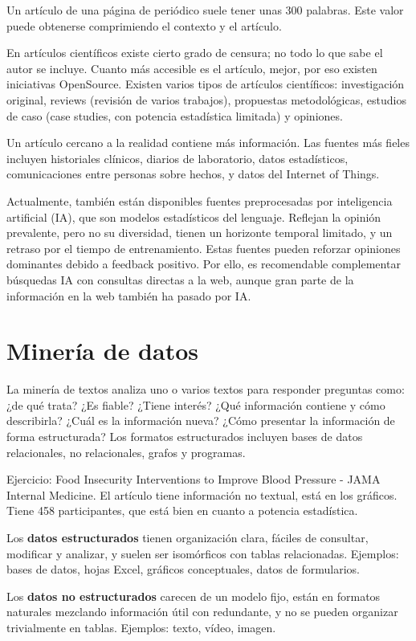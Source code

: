 Un artículo de una página de periódico suele tener unas 300 palabras. Este valor puede obtenerse comprimiendo el contexto y el artículo.

En artículos científicos existe cierto grado de censura; no todo lo que sabe el autor se incluye. Cuanto más accesible es el artículo, mejor, por eso existen iniciativas OpenSource. Existen varios tipos de artículos científicos: investigación original, reviews (revisión de varios trabajos), propuestas metodológicas, estudios de caso (case studies, con potencia estadística limitada) y opiniones.

Un artículo cercano a la realidad contiene más información. Las fuentes más fieles incluyen historiales clínicos, diarios de laboratorio, datos estadísticos, comunicaciones entre personas sobre hechos, y datos del Internet of Things.

Actualmente, también están disponibles fuentes preprocesadas por inteligencia artificial (IA), que son modelos estadísticos del lenguaje. Reflejan la opinión prevalente, pero no su diversidad, tienen un horizonte temporal limitado, y un retraso por el tiempo de entrenamiento. Estas fuentes pueden reforzar opiniones dominantes debido a feedback positivo. Por ello, es recomendable complementar búsquedas IA con consultas directas a la web, aunque gran parte de la información en la web también ha pasado por IA.

\section{Minería de datos}
La minería de textos analiza uno o varios textos para responder preguntas como: ¿de qué trata? ¿Es fiable? ¿Tiene interés? ¿Qué información contiene y cómo describirla? ¿Cuál es la información nueva? ¿Cómo presentar la información de forma estructurada?
Los formatos estructurados incluyen bases de datos relacionales, no relacionales, grafos y programas.

Ejercicio: Food Insecurity Interventions to Improve Blood Pressure - JAMA Internal Medicine. 
El artículo tiene información no textual, está en los gráficos. Tiene 458 participantes, que está bien en cuanto a potencia estadística. 

Los \textbf{datos estructurados} tienen organización clara, fáciles de consultar, modificar y analizar, y suelen ser isomórficos con tablas relacionadas. Ejemplos: bases de datos, hojas Excel, gráficos conceptuales, datos de formularios.

Los \textbf{datos no estructurados} carecen de un modelo fijo, están en formatos naturales mezclando información útil con redundante, y no se pueden organizar trivialmente en tablas. Ejemplos: texto, vídeo, imagen.

